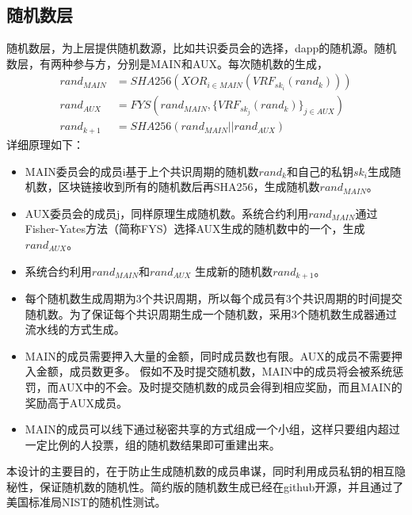 \documentclass[12pt, UTF8]{article}
\begin{document}
\subsection{随机数层}
随机数层，为上层提供随机数源，比如共识委员会的选择，dapp的随机源。随机数层，有两种参与方，分别是MAIN和AUX。每次随机数的生成，
\begin{align}
rand_{MAIN} &= SHA256(XOR_{i\in{MAIN}} (VRF_{sk_i}(rand_k)))\\
rand_{AUX} &= FYS(rand_{MAIN}, \{VRF_{sk_j}(rand_k)\}_{j\in{AUX}})\\
rand_{k+1} &= SHA256(rand_{MAIN} || rand_{AUX})
\end{align}
详细原理如下：
\begin{itemize}
\item MAIN委员会的成员i基于上个共识周期的随机数$rand_k$和自己的私钥$sk_i$生成随机数，区块链接收到所有的随机数后再SHA256，生成随机数$rand_{MAIN} $。
\item AUX委员会的成员j，同样原理生成随机数。系统合约利用$rand_{MAIN}$通过Fisher-Yates方法（简称FYS）\cite{fisher1943statistical}选择AUX生成的随机数中的一个，生成$rand_{AUX}$。
\item 系统合约利用$rand_{MAIN}$和$rand_{AUX}$ 生成新的随机数$rand_{k+1}$。
\item 每个随机数生成周期为3个共识周期，所以每个成员有3个共识周期的时间提交随机数。为了保证每个共识周期生成一个随机数，采用3个随机数生成器通过流水线的方式生成。
\item MAIN的成员需要押入大量的金额，同时成员数也有限。AUX的成员不需要押入金额，成员数更多。 假如不及时提交随机数，MAIN中的成员将会被系统惩罚，而AUX中的不会。及时提交随机数的成员会得到相应奖励，而且MAIN的奖励高于AUX成员。
\item MAIN的成员可以线下通过秘密共享的方式组成一个小组，这样只要组内超过一定比例的人投票，组的随机数结果即可重建出来。
\end{itemize}

本设计的主要目的，在于防止生成随机数的成员串谋，同时利用成员私钥的相互隐秘性，保证随机数的随机性。简约版的随机数生成已经在github开源\cite{githubrandgen}，并且通过了美国标准局NIST的随机性测试\cite{githubrandreport}。
\end{document}
